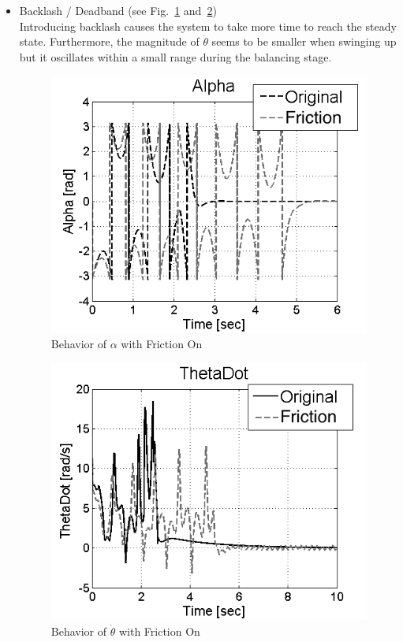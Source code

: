 \documentclass{article}
\theoremstyle{plain}
\theoremstyle{definition}
\theoremstyle{remark}
\begin{document}
\begin{itemize}
\item Backlash / Deadband (see Fig.~\ref{fig:q10_b1} and~\ref{fig:q10_b2})\\
Introducing backlash causes the system to take more time to reach the steady state. Furthermore, the magnitude of $\dot{\theta}$ seems to be smaller when swinging up but it oscillates within a small range during the balancing stage.
\begin{figure}[h]
\includegraphics[width=1\textwidth]{q10_b1.png}
\caption{Behavior of $\alpha$ with Friction On} \label{tex}
\label{fig:q10_b1}
\end{figure}
\begin{figure}[h]
\includegraphics[width=1\textwidth]{q10_b2.png}
\caption{Behavior of $\dot{\theta}$ with Friction On} \label{tex}
\label{fig:q10_b2}
\end{figure}


\end{itemize}
\end{document}
